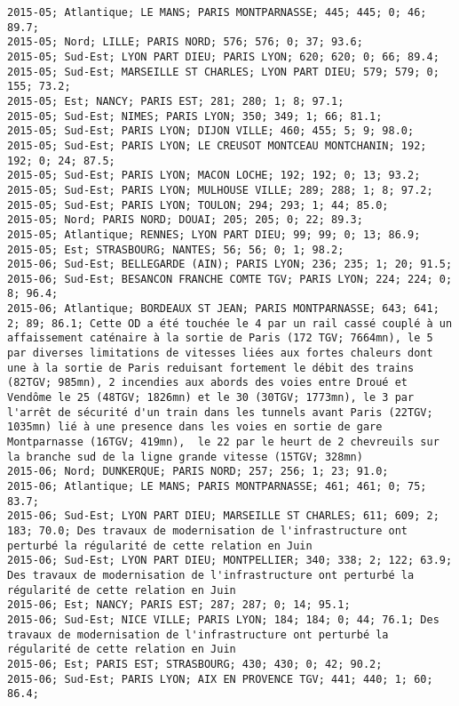 \documentclass{article}
\begin{document}
\begin{Verbatim}[commandchars=\\\{\}]
2015-05; Atlantique; LE MANS; PARIS MONTPARNASSE; 445; 445; 0; 46; 89.7; 
2015-05; Nord; LILLE; PARIS NORD; 576; 576; 0; 37; 93.6; 
2015-05; Sud-Est; LYON PART DIEU; PARIS LYON; 620; 620; 0; 66; 89.4; 
2015-05; Sud-Est; MARSEILLE ST CHARLES; LYON PART DIEU; 579; 579; 0; 155; 73.2; 
2015-05; Est; NANCY; PARIS EST; 281; 280; 1; 8; 97.1; 
2015-05; Sud-Est; NIMES; PARIS LYON; 350; 349; 1; 66; 81.1; 
2015-05; Sud-Est; PARIS LYON; DIJON VILLE; 460; 455; 5; 9; 98.0; 
2015-05; Sud-Est; PARIS LYON; LE CREUSOT MONTCEAU MONTCHANIN; 192; 192; 0; 24; 87.5; 
2015-05; Sud-Est; PARIS LYON; MACON LOCHE; 192; 192; 0; 13; 93.2; 
2015-05; Sud-Est; PARIS LYON; MULHOUSE VILLE; 289; 288; 1; 8; 97.2; 
2015-05; Sud-Est; PARIS LYON; TOULON; 294; 293; 1; 44; 85.0; 
2015-05; Nord; PARIS NORD; DOUAI; 205; 205; 0; 22; 89.3; 
2015-05; Atlantique; RENNES; LYON PART DIEU; 99; 99; 0; 13; 86.9; 
2015-05; Est; STRASBOURG; NANTES; 56; 56; 0; 1; 98.2; 
2015-06; Sud-Est; BELLEGARDE (AIN); PARIS LYON; 236; 235; 1; 20; 91.5; 
2015-06; Sud-Est; BESANCON FRANCHE COMTE TGV; PARIS LYON; 224; 224; 0; 8; 96.4; 
2015-06; Atlantique; BORDEAUX ST JEAN; PARIS MONTPARNASSE; 643; 641; 2; 89; 86.1; Cette OD a été touchée le 4 par un rail cassé couplé à un affaissement caténaire à la sortie de Paris (172 TGV; 7664mn), le 5 par diverses limitations de vitesses liées aux fortes chaleurs dont une à la sortie de Paris reduisant fortement le débit des trains (82TGV; 985mn), 2 incendies aux abords des voies entre Droué et Vendôme le 25 (48TGV; 1826mn) et le 30 (30TGV; 1773mn), le 3 par l'arrêt de sécurité d'un train dans les tunnels avant Paris (22TGV; 1035mn) lié à une presence dans les voies en sortie de gare Montparnasse (16TGV; 419mn),  le 22 par le heurt de 2 chevreuils sur la branche sud de la ligne grande vitesse (15TGV; 328mn)
2015-06; Nord; DUNKERQUE; PARIS NORD; 257; 256; 1; 23; 91.0; 
2015-06; Atlantique; LE MANS; PARIS MONTPARNASSE; 461; 461; 0; 75; 83.7; 
2015-06; Sud-Est; LYON PART DIEU; MARSEILLE ST CHARLES; 611; 609; 2; 183; 70.0; Des travaux de modernisation de l'infrastructure ont perturbé la régularité de cette relation en Juin
2015-06; Sud-Est; LYON PART DIEU; MONTPELLIER; 340; 338; 2; 122; 63.9; Des travaux de modernisation de l'infrastructure ont perturbé la régularité de cette relation en Juin
2015-06; Est; NANCY; PARIS EST; 287; 287; 0; 14; 95.1; 
2015-06; Sud-Est; NICE VILLE; PARIS LYON; 184; 184; 0; 44; 76.1; Des travaux de modernisation de l'infrastructure ont perturbé la régularité de cette relation en Juin
2015-06; Est; PARIS EST; STRASBOURG; 430; 430; 0; 42; 90.2; 
2015-06; Sud-Est; PARIS LYON; AIX EN PROVENCE TGV; 441; 440; 1; 60; 86.4; 

\end{Verbatim}
\end{document}
